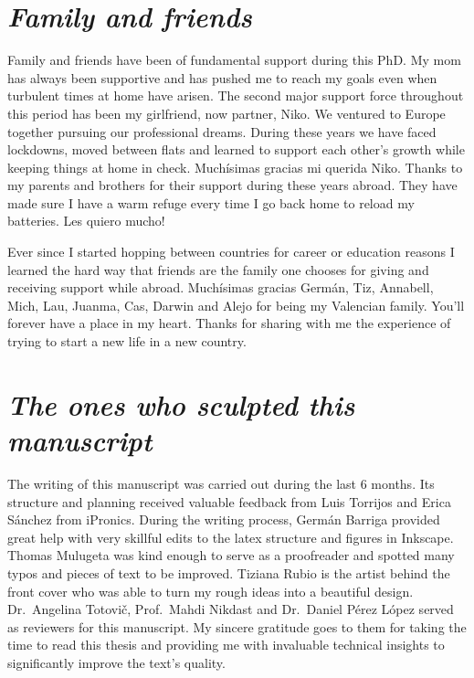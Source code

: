 \section*{\textit{Family and friends}}

Family and friends have been of fundamental support during this PhD.
My mom has always been supportive and has pushed me to reach my goals even when turbulent times at home have arisen.
The second major support force throughout this period has been my girlfriend, now partner, Niko.
We ventured to Europe together pursuing our professional dreams.
During these years we have faced lockdowns, moved between flats and learned to support each other's growth while keeping things at home in check.
Muchísimas gracias mi querida Niko.
Thanks to my parents and brothers for their support during these years abroad.
They have made sure I have a warm refuge every time I go back home to reload my batteries.
Les quiero mucho!

Ever since I started hopping between countries for career or education reasons I learned the hard way that friends are the family one chooses for giving and receiving support while abroad.
Muchísimas gracias Germán, Tiz, Annabell, Mich, Lau, Juanma, Cas, Darwin and Alejo for being my Valencian family.
You'll forever have a place in my heart.
Thanks for sharing with me the experience of trying to start a new life in a new country.

\section*{\textit{The ones who sculpted this manuscript}}

The writing of this manuscript was carried out during the last 6 months.
Its structure and planning received valuable feedback from Luis Torrijos and Erica Sánchez from iPronics.
During the writing process, Germán Barriga provided great help with very skillful edits to the latex structure and figures in Inkscape.
Thomas Mulugeta was kind enough to serve as a proofreader and spotted many typos and pieces of text to be improved.
Tiziana Rubio is the artist behind the front cover who was able to turn my rough ideas into a beautiful design.
Dr.~Angelina Totovič, Prof.~Mahdi Nikdast and Dr.~Daniel Pérez López served as reviewers for this manuscript.
My sincere gratitude goes to them for taking the time to read this thesis and providing me with invaluable technical insights to significantly improve the text's quality.

